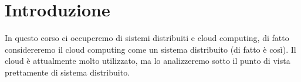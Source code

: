 \chapter{Introduzione}
In questo corso ci occuperemo di sistemi distribuiti e cloud computing, di fatto considereremo il cloud computing come un sistema distribuito (di fatto è così).
Il cloud è attualmente molto utilizzato, ma lo analizzeremo sotto il punto di vista prettamente di sistema distribuito.